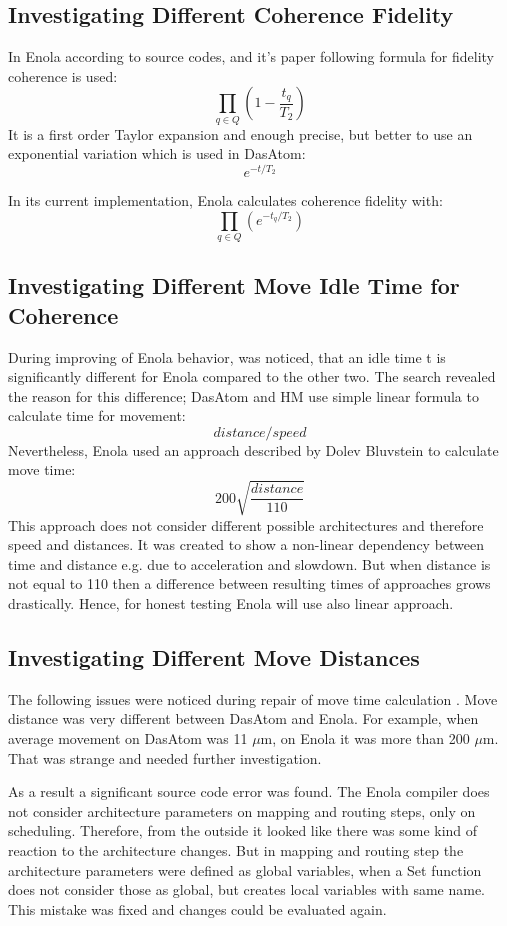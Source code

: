 \subsection{Investigating Different Coherence Fidelity}
In Enola according to source codes, and it's paper following formula for fidelity coherence is used:
\[\prod_{q \in Q} \left(1 - \frac{t_q}{T_2} \right)\]
It is a first order Taylor expansion and enough precise, but better to use an exponential variation which is used in DasAtom:
\[e^{-t / T_2}\]

In its current implementation, Enola calculates coherence fidelity with: \[\prod_{q \in Q} \left(e^{-t_q /  T_2} \right)\]

\subsection{Investigating Different Move Idle Time for Coherence}
During improving of Enola behavior, was noticed, that an idle time t is significantly different for Enola compared to the other two.
The search revealed the reason for this difference; DasAtom and \ac{HM} use simple linear formula to calculate time for movement: \[distance/speed\]
Nevertheless, Enola used an approach described by Dolev Bluvstein to calculate move time:
\[200 \sqrt{\frac{distance}{110}}\]
This approach does not consider different possible architectures and therefore speed and distances. 
It was created to show a non-linear dependency between time and distance e.g. due to acceleration and slowdown.
But when distance is not equal to 110 then a difference between resulting times of approaches grows drastically.
Hence, for honest testing Enola will use also linear approach.

\subsection{Investigating Different Move Distances}
The following issues were noticed during repair of move time calculation \parencite{Emil_Khusainov_Bachelor_GIT}. 
Move distance was very different between DasAtom and Enola. 
For example, when average movement on DasAtom was 11 $\mu$m, on Enola it was more than 200 $\mu$m. 
That was strange and needed further investigation.

As a result a significant source code error was found. 
The Enola compiler does not consider architecture parameters on mapping and routing steps, only on scheduling.
Therefore, from the outside it looked like there was some kind of reaction to the architecture changes.
But in mapping and routing step the architecture parameters were defined as global variables, 
when a Set function does not consider those as global, but creates local variables with same name.
This mistake was fixed and changes could be evaluated again.

